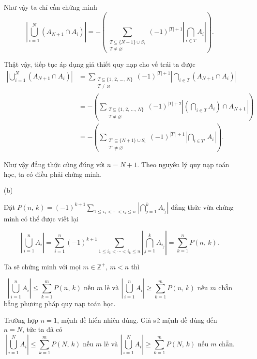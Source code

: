 \begin{enumerate}
{        Như vậy ta chỉ cần chứng minh 
        $$\left|\bigcup\limits_{i=1}^N\left(A_{N+1} \cap A_i\right)\right| = -\left(\sum\limits_{\substack{T \subseteq \{N+1\} \cup S_i \\ T \ne \varnothing}} (-1)^{|T| + 1} \left|\bigcap\limits_{i \in T} A_i\right|\right).$$

        Thật vậy, tiếp tục áp dụng giả thiết quy nạp cho vế trái ta được
        \begin{align*}
            \left|\bigcup\limits_{i=1}^N\left(A_{N+1} \cap A_i\right)\right|
            &= \sum\limits_{\substack{T \subseteq \{1,\,2,\,\ldots,\,N\} \\ T \ne \varnothing}} (-1)^{|T| + 1} \left|\bigcap\limits_{i \in T} \left(A_{N+1} \cap A_i\right)\right| \\
            &= -\left(\sum\limits_{\substack{T \subseteq \{1,\,2,\,\ldots,\,N\} \\ T \ne \varnothing}} (-1)^{|T| + 2} \left|\left(\bigcap\limits_{i \in T} A_i\right) \cap A_{N+1}\right|\right) \\
            &= -\left(\sum\limits_{\substack{T' \subseteq \{N+1\} \cup S_i \\ T' \ne \varnothing}} (-1)^{|T'| + 1} \left|\bigcap\limits_{i \in T'} A_i\right|\right).
        \end{align*}

        Như vậy đẳng thức cũng đúng với $n = N+1$. Theo nguyên lý quy nạp toán học, ta có điều phải chứng minh.
    }
    \item[(b)] {
        Đặt $\displaystyle P(n,\,k) = (-1)^{k+1}\sum\limits_{1 \leq i_1 < \cdots < i_k \leq n} \left|\bigcap\limits_{j=1}^k A_{i_j} \right|$ đẳng thức vừa chứng minh có thể được viết lại 

        $$\left|\bigcup\limits_{i = 1}^n A_i\right| = \sum\limits_{i = 1}^n (-1)^{k+1} \sum\limits_{1 \leq i_1 < \cdots < i_k \leq n} \left|\bigcap\limits_{j=1}^k A_{i_j} \right| = \sum\limits_{k = 1}^n P(n,\,k).$$

        Ta sẽ chứng minh với mọi $m \in \mathbb{Z^+},\,m < n$ thì 

        $$\left|\bigcup\limits_{i = 1}^n A_i\right| \leq \sum\limits_{k = 1}^m P(n,\,k) \text{ nếu $m$ lẻ và }\left|\bigcup\limits_{i = 1}^n A_i\right| \geq \sum\limits_{k = 1}^m P(n,\,k) \text{ nếu $m$ chẵn}$$ bằng phương pháp quy nạp toán học.

        Trường hợp $n = 1$, mệnh đề hiển nhiên đúng. Giả sử mệnh đề đúng đến $n = N$, tức ta đã có 
        $$\left|\bigcup\limits_{i = 1}^N A_i\right| \leq \sum\limits_{k = 1}^m P(N,\,k) \text{ nếu $m$ lẻ và }\left|\bigcup\limits_{i = 1}^N A_i\right| \geq \sum\limits_{k = 1}^m P(N,\,k) \text{ nếu $m$ chẵn}.$$

}
\end{enumerate}
